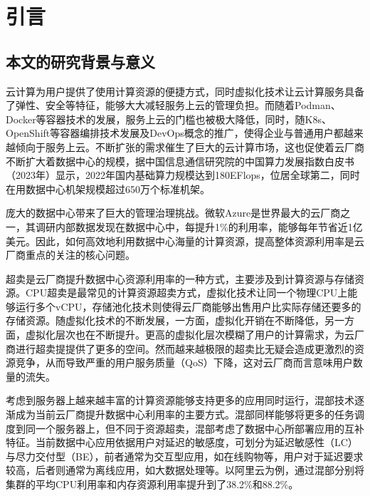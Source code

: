 \chapter{引言}\label{chap:introduction}

\section{本文的研究背景与意义}


云计算为用户提供了使用计算资源的便捷方式，同时虚拟化技术让云计算服务具备了弹性、安全等特征，能够大大减轻服务上云的管理负担。而随着Podman、Docker等容器技术的发展，服务上云的门槛也被极大降低，同时，随K8s、OpenShift等容器编排技术发展及DevOps概念的推广，使得企业与普通用户都越来越倾向于服务上云。不断扩张的需求催生了巨大的云计算市场，这也促使着云厂商不断扩大着数据中心的规模，据中国信息通信研究院的中国算力发展指数白皮书（2023年）显示，2022年国内基础算力规模达到180EFlops，位居全球第二，同时在用数据中心机架规模超过650万个标准机架\citep{chinaict2023}。

庞大的数据中心带来了巨大的管理治理挑战。微软Azure是世界最大的云厂商之一，其调研内部数据发现在数据中心中，每提升1\%的利用率，能够每年节省近1亿美元\citep{hadary2020protean}。因此，如何高效地利用数据中心海量的计算资源，提高整体资源利用率是云厂商重点的关注的核心问题。

超卖是云厂商提升数据中心资源利用率的一种方式，主要涉及到计算资源与存储资源。CPU超卖是最常见的计算资源超卖方式，虚拟化技术让同一个物理CPU上能够运行多个vCPU，存储池化技术则使得云厂商能够出售用户比实际存储还要多的存储资源。随虚拟化技术的不断发展，一方面，虚拟化开销在不断降低，另一方面，虚拟化层次也在不断提升。更高的虚拟化层次模糊了用户的计算需求，为云厂商进行超卖提提供了更多的空间。然而越来越极限的超卖比无疑会造成更激烈的资源竞争，从而导致严重的用户服务质量（QoS）下降，这对云厂商而言意味用户数量的流失。

考虑到服务器上越来越丰富的计算资源能够支持更多的应用同时运行，混部技术逐渐成为当前云厂商提升数据中心利用率的主要方式。混部同样能够将更多的任务调度到同一个服务器上，但不同于资源超卖，混部考虑了数据中心所部署应用的互补特征。当前数据中心应用依据用户对延迟的敏感度，可划分为延迟敏感性（LC）与尽力交付型（BE），前者通常为交互型应用，如在线购物等，用户对于延迟要求较高，后者则通常为离线应用，如大数据处理等。以阿里云为例，通过混部分别将集群的平均CPU利用率和内存资源利用率提升到了38.2\%和88.2\%\citep{guo2019limits}。

